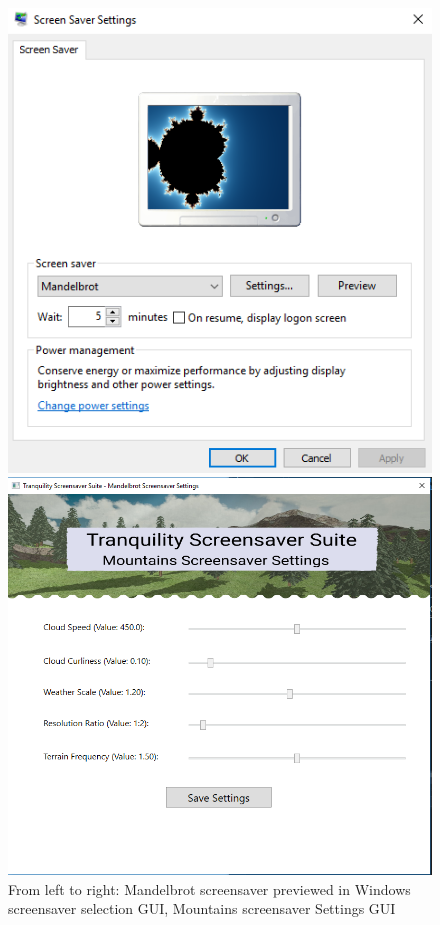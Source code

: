 \documentclass[10pt, openany]{book}
\begin{document}
\begin{figure}[H]
	\centering
	\begin{minipage}{.5\textwidth}
		\centering
	  	\includegraphics[width=0.9\linewidth]{windows-gui}
	\end{minipage}%
	\begin{minipage}{.5\textwidth}
	  	\centering
		\includegraphics[width=0.9\linewidth]{settings-gui}
	\end{minipage}
	\caption{From left to right: Mandelbrot screensaver previewed in Windows screensaver selection GUI, Mountains screensaver Settings GUI}
\end{figure}
\end{document}
